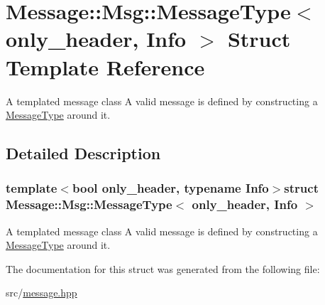 \hypertarget{struct_message_1_1_msg_1_1_message_type}{\section{Message\-:\-:Msg\-:\-:Message\-Type$<$ only\-\_\-header, Info $>$ Struct Template Reference}
\label{struct_message_1_1_msg_1_1_message_type}
}


A templated message class A valid message is defined by constructing a \hyperlink{struct_message_1_1_msg_1_1_message_type}{Message\-Type} around it.  




\subsection{Detailed Description}
\subsubsection*{template$<$bool only\-\_\-header, typename Info$>$struct Message\-::\-Msg\-::\-Message\-Type$<$ only\-\_\-header, Info $>$}

A templated message class A valid message is defined by constructing a \hyperlink{struct_message_1_1_msg_1_1_message_type}{Message\-Type} around it. 

The documentation for this struct was generated from the following file\-:\begin{DoxyCompactItemize}
\item 
src/\hyperlink{message_8hpp}{message.\-hpp}\end{DoxyCompactItemize}
